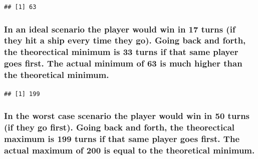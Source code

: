 \documentclass[
]{article}
\newenvironment{Shaded}{\begin{snugshade}}{\end{snugshade}}
\newcommand{\CommentTok}[1]{\textcolor[rgb]{0.56,0.35,0.01}{\textit{#1}}}
\newcommand{\ControlFlowTok}[1]{\textcolor[rgb]{0.13,0.29,0.53}{\textbf{#1}}}
\newcommand{\DecValTok}[1]{\textcolor[rgb]{0.00,0.00,0.81}{#1}}
\newcommand{\FunctionTok}[1]{\textcolor[rgb]{0.13,0.29,0.53}{\textbf{#1}}}
\newcommand{\NormalTok}[1]{#1}
\newcommand{\SpecialCharTok}[1]{\textcolor[rgb]{0.81,0.36,0.00}{\textbf{#1}}}
\begin{document}
\begin{Shaded}
\end{Shaded}

\begin{verbatim}
## [1] 63
\end{verbatim}

\subsubsection{In an ideal scenario the player would win in 17 turns (if
they hit a ship every time they go). Going back and forth, the
theorectical minimum is 33 turns if that same player goes first. The
actual minimum of 63 is much higher than the theoretical
minimum.}\label{in-an-ideal-scenario-the-player-would-win-in-17-turns-if-they-hit-a-ship-every-time-they-go.-going-back-and-forth-the-theorectical-minimum-is-33-turns-if-that-same-player-goes-first.-the-actual-minimum-of-63-is-much-higher-than-the-theoretical-minimum.}

\begin{Shaded}
\end{Shaded}

\begin{verbatim}
## [1] 199
\end{verbatim}

\subsubsection{In the worst case scenario the player would win in 50
turns (if they go first). Going back and forth, the theorectical maximum
is 199 turns if that same player goes first. The actual maximum of 200
is equal to the theoretical
minimum.}\label{in-the-worst-case-scenario-the-player-would-win-in-50-turns-if-they-go-first.-going-back-and-forth-the-theorectical-maximum-is-199-turns-if-that-same-player-goes-first.-the-actual-maximum-of-200-is-equal-to-the-theoretical-minimum.}
\end{document}
